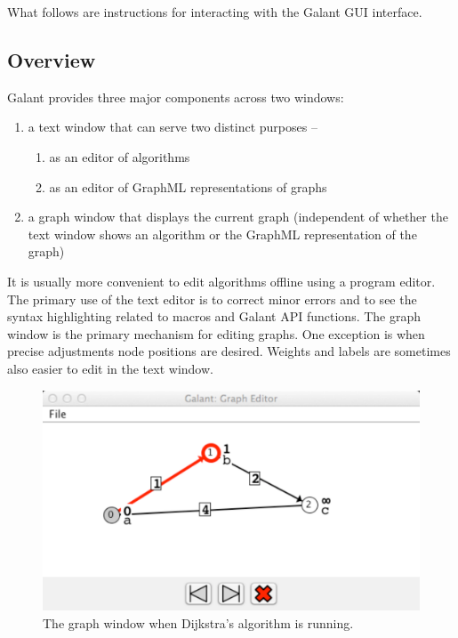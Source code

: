 
What follows are instructions for interacting with the Galant GUI interface.

\subsection{Overview}

Galant provides three major components across two windows:
\begin{enumerate}
\item
a text window that can serve two distinct purposes --
\begin{enumerate}
\item as an editor of algorithms
\item as an editor of GraphML representations of graphs
\end{enumerate}
\item
a graph window that displays the current graph (independent of whether
the text window shows an algorithm or the GraphML representation of the graph)
\end{enumerate}

It is usually more convenient to edit algorithms
offline using a program editor.
The primary use of the text editor is to correct minor errors and
to see the syntax highlighting related to macros and Galant API functions.
The graph window is the primary mechanism for editing graphs.
One exception is when precise adjustments node positions are desired.
Weights and labels are sometimes also easier to edit in the text window.



\begin{figure}[p!]
\includegraphics[scale=0.5]{X_dijkstra_running}
\caption{The graph window when Dijkstra's algorithm is running.}
\label{fig:dijkstra_running}
\end{figure}

